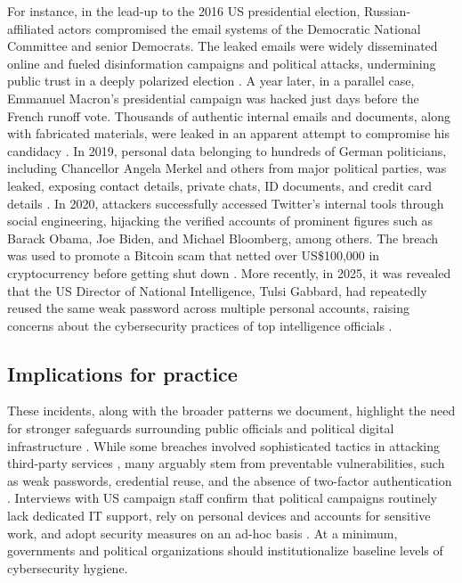 \documentclass[12pt, letterpaper]{article}
\begin{document}
For instance, in the lead-up to the 2016 US presidential election, Russian-affiliated actors compromised the email systems of the Democratic National Committee and senior Democrats.
The leaked emails were widely disseminated online and fueled disinformation campaigns and political attacks, undermining public trust in a deeply polarized election \citep{dnc2016hack_guardian, dnc2016hack_crowdstrike}.
A year later, in a parallel case, Emmanuel Macron's presidential campaign was hacked just days before the French runoff vote.
Thousands of authentic internal emails and documents, along with fabricated materials, were leaked in an apparent attempt to compromise his candidacy \citep{macron2017hack, shires2019}.
In 2019, personal data belonging to hundreds of German politicians, including Chancellor Angela Merkel and others from major political parties, was leaked, exposing contact details, private chats, ID documents, and credit card details \citep{germany2019}.
In 2020, attackers successfully accessed Twitter's internal tools through social engineering, hijacking the verified accounts of prominent figures such as Barack Obama, Joe Biden, and Michael Bloomberg, among others.
The breach was used to promote a Bitcoin scam that netted over US\$100,000 in cryptocurrency before getting shut down \citep{twitterhack2020, twitterhackwitman2022}.
More recently, in 2025, it was revealed that the US Director of National Intelligence, Tulsi Gabbard, had repeatedly reused the same weak password across multiple personal accounts, raising concerns about the cybersecurity practices of top intelligence officials \citep{gabbard2025wired}.


\subsection{Implications for practice}
These incidents, along with the broader patterns we document, highlight the need for stronger safeguards surrounding public officials and political digital infrastructure \citep{Ribeiro2025GIQ}.
While some breaches involved sophisticated tactics in attacking third-party services \citep{twitterhack2020, twitterhackwitman2022}, many arguably stem from preventable vulnerabilities, such as weak passwords, credential reuse, and the absence of two-factor authentication \citep{consolvo2021democracy, germany2019,germany2019-weak-passwords,twitterhack2020, gabbard2025wired, hegseth2025nyt, Ribeiro2025GIQ}.
Interviews with US campaign staff confirm that political campaigns routinely lack dedicated IT support, rely on personal devices and accounts for sensitive work, and adopt security measures on an ad-hoc basis \citep{consolvo2021democracy}.
At a minimum, governments and political organizations should institutionalize baseline levels of cybersecurity hygiene.
\end{document}
